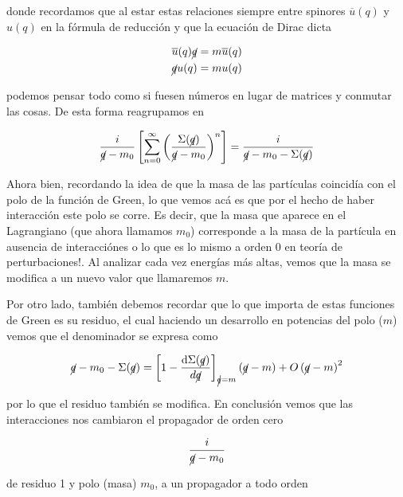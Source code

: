 \documentclass[tickz]{article}
\numberwithin{equation}{section}
\begin{document}
donde recordamos que al estar estas relaciones siempre entre spinores $ \overline{u}(q) $ y $ u(q) $ en la fórmula de reducción y que la ecuación de Dirac dicta

\begin{equation}\label{key}
\begin{aligned}
\overline{u}(q) \cancel{q}&=m\overline{u}(q)\\
\cancel{q} u(q)&= m u(q)
\end{aligned}
\end{equation}

podemos pensar todo como si fuesen números en lugar de matrices y conmutar las cosas. De esta forma reagrupamos en

\begin{equation}\label{mpolo}
\frac{i}{\cancel{q}- m_0} \left[ \sum_{n=0}^{\infty} \left(\frac{\Sigma(\cancel{q})}{\cancel{q}- m_0}\right)^n\right] = \frac{i}{\cancel{q}- m_0 - \Sigma(\cancel{q})}
\end{equation}

Ahora bien, recordando la idea de que la masa de las partículas coincidía con el polo de la función de Green, lo que vemos acá es que por el hecho de haber interacción este polo se corre. Es decir, que la masa que aparece en el Lagrangiano  (que ahora llamamos $ m_0 $) corresponde a la masa de la partícula en ausencia de interacciónes o lo que es lo mismo a orden 0 en teoría de perturbaciones!. Al analizar cada vez energías más altas, vemos que la masa se modifica a un nuevo valor que llamaremos $ m $. 

Por otro lado, también debemos recordar que lo que importa de estas funciones de Green es su residuo, el cual haciendo un desarrollo en potencias del polo ($ m $) vemos que el denominador se expresa como

\begin{equation}\label{key}
\cancel{q} - m_0 - \Sigma(\cancel{q}) = \left[ 1 -\frac{\mathrm{d}\Sigma(\cancel{q})}{d\cancel{q}}\right]_{\cancel{q}=m} \left(\cancel{q}-m\right)  + O\left(\cancel{q}-m\right)^2
\end{equation}

por lo que el residuo también se modifica. En conclusión vemos que las interacciones nos cambiaron el propagador de orden cero

\begin{equation}\label{key}
\frac{i}{\cancel{q} - m_0}
\end{equation}

de residuo 1 y polo (masa) $ m_0 $, a un propagador a todo orden
\end{document}
